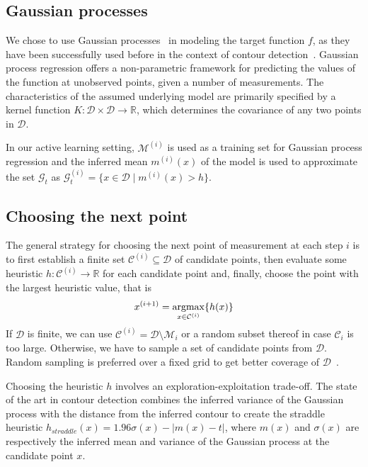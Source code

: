 \documentclass[11pt]{article} %
\newcommand{\argmax}{\operatornamewithlimits{argmax}}
\begin{document}
\subsection{Gaussian processes}
We chose to use Gaussian processes~\cite{gpbook} in modeling the target
function $f$, as they have been successfully used before in the context of
contour detection~\cite{bryan2005, bryan2008}. Gaussian process regression
offers a non-parametric framework for predicting the values of the function at
unobserved points, given a number of measurements. The characteristics of
the assumed underlying model are primarily specified by a kernel function
${K : \mathcal{D} \times \mathcal{D} \to \mathbb{R}}$, which determines the
covariance of any two points in $\mathcal{D}$.

In our active learning setting, $\mathcal{M}^{(i)}$ is used as a training set
for Gaussian process regression and the inferred mean $m^{(i)}(x)$ of the
model is used to approximate the set $\mathcal{G}_t$ as
${\mathcal{G}^{(i)}_t = \{x \in \mathcal{D} \mid m^{(i)}(x) > h\}}$.

\subsection{Choosing the next point}
The general strategy for choosing the next point of measurement at each step $i$
is to first establish a finite set $\mathcal{C}^{(i)} \subseteq \mathcal{D}$ of
candidate points, then evaluate some heuristic
${h : \mathcal{C}^{(i)} \to \mathbb{R}}$ for each candidate point and, finally,
choose the point with the largest heuristic value, that is
\begin{align*}
  x^{(i+1)} = \underset{x \in \mathcal{C}^{(i)}}{\argmax}\{h(x)\}
\end{align*}
If $\mathcal{D}$ is finite, we can use
$\mathcal{C}^{(i)} = \mathcal{D}\setminus\mathcal{M}_i$ or a random subset
thereof in case $\mathcal{C}_i$ is too large. Otherwise, we have to sample a set
of candidate points from $\mathcal{D}$. Random sampling is preferred over a
fixed grid to get better coverage of $\mathcal{D}$~\cite{bryan2005}.

Choosing the heuristic $h$ involves an exploration-exploitation trade-off. The
state of the art in contour detection combines the inferred variance of the
Gaussian process with the
distance from the inferred contour to create the straddle~\cite{bryan2005}
heuristic ${h_{straddle}(x) = 1.96\sigma(x) - | m(x) - t |}$, where $m(x)$
and $\sigma(x)$ are respectively the inferred mean and variance of the Gaussian
process at the candidate point $x$.
\end{document}
